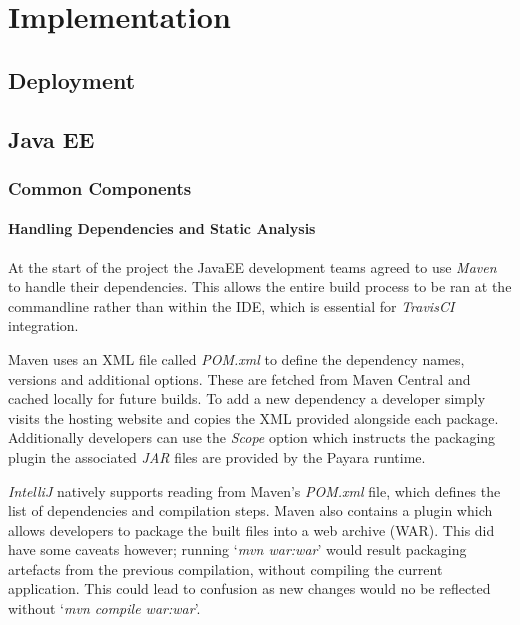 \chapter{Implementation}

\section{Deployment}

\section{Java EE}
    \subsection{Common Components}
        \subsubsection{Handling Dependencies and Static Analysis}
        \par
        At the start of the project the JavaEE development teams agreed to use \textit{Maven}\cite{Maven} to handle their dependencies. This allows the entire build process to be ran at the commandline rather than within the IDE, which is essential for \textit{TravisCI} integration.

        \par
        Maven uses an XML file called \textit{POM.xml} to define the dependency names, versions and additional options. These are fetched from Maven Central and cached locally for future builds. To add a new dependency a developer simply visits the hosting website and copies the XML provided alongside each package. Additionally developers can use the \textit{Scope} option which instructs the packaging plugin the associated \textit{JAR} files are provided by the Payara runtime.
        
        \par
        \textit{IntelliJ} natively supports reading from Maven's \textit{POM.xml} file, which defines the list of dependencies and compilation steps. Maven also contains a plugin which allows developers to package the built files into a web archive (WAR). This did have some caveats however; running 
        `\textit{mvn war:war}' would result packaging artefacts from the previous compilation, without compiling the current application. This could lead to confusion as new changes would no be reflected without `\textit{mvn compile war:war}'.

